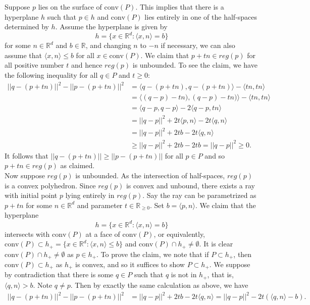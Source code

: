 \documentclass[12pt,reqno]{amsart}
\theoremstyle{definition}
\newcommand{\RR}{\mathbb{R}}
\newcommand{\conv}[1]{\mathrm{conv}(#1)}
\newcommand{\inner}[1]{\langle #1 \rangle}
\begin{document}
Suppose $p$ lies on the surface of $\conv{P}$. This implies that there is a hyperplane $h$ such that $p\in h$  and $\conv{P}$ lies entirely in one of the half-spaces determined by $h$. Assume the hyperplane is given by $$h=\{x\in \RR^d: \inner{x, n} = b \}$$ for some $n\in \RR^d$ and $b\in \RR$, and changing $n$ to $-n$ if necessary, we can also assume that $ \inner{x, n} \leq b$ for all $x\in \conv{P}$. We claim that $p+tn \in reg(p)$ for all positive number $t$ and hence $reg(p)$ is unbounded. To see the claim, we have the following inequality for all $q\in P$ and $t\geq 0$:
\begin{align*}
  ||q - (p+tn)||^2 - || p-(p+tn) ||^2 & = \inner{q - (p+tn),q - (p+tn)} - \inner{tn,tn}     \\
                                      & = \inner{(q - p) - tn),(q - p)-tn)} - \inner{tn,tn} \\
                                      & =\inner{ q - p,q - p} -2\inner{q - p,tn}            \\
                                      & = ||q-p||^2 +2t\inner{p,n} - 2t\inner{q,n}          \\
                                      & = ||q-p||^2 + 2tb - 2t\inner{q,n}                   \\
                                      & \geq  ||q-p||^2 + 2tb -2tb =||q-p||^2 \geq 0.
\end{align*}
It follows that $||q - (p+tn)|| \geq || p-(p+tn) ||$ for all $p\in P$ and so $p+tn \in reg(p)$ as claimed.\\


Now suppose $reg(p)$ is unbounded. As the intersection of half-spaces, $reg(p)$ is a convex polyhedron. Since $reg(p)$ is convex and unbound, there exists a ray with initial point $p$ lying entirely in $reg(p)$. Say the ray can be parametrized as $p+tn$ for some $n\in \RR^d$ and parameter $t\in \RR_{\geq 0}$. Set $b= \inner{p,n}$. We claim that the hyperplane $$h=\{x\in \RR^d: \inner{x, n} = b \}$$ intersects with $\conv{P}$  at a face of  $\conv{P}$, or equivalently, $\conv{P}\subset h_+ =\{x\in \RR^d: \inner{x, n} \leq b \}$ and $\conv{P} \cap h_+ \not= \emptyset$. It is clear $\conv{P} \cap h_+ \not= \emptyset$ as $p\in h_+$. To prove the claim, we note that if $P\subset h_+$, then $\conv{P}\subset h_+$ as $h_+$ is convex, and so it suffices to show $P\subset h_+$. We suppose by contradiction that there is some $q\in P$ such that $q$ is not in $h_+$, that is, $\inner{q,n}>b$. Note $q\not= p$. Then by exactly the same calculation as above, we have
\begin{align*}
  ||q-(p+tn)||^2  - ||p-(p+tn)||^2 & = ||q-p||^2 + 2tb - 2t\inner{q,n} =  ||q-p||^2 - 2t( \inner{q,n} -b).
\end{align*}
\end{document}
